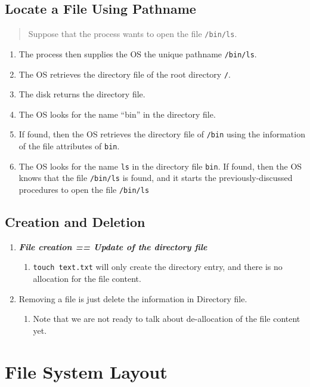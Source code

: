 \documentclass[]{report}
\renewcommand{\emph}[1]{\textbf{\textit{#1}}}
\begin{document}
		\subsection{Locate a File Using Pathname}
		\begin{quote}
			Suppose that the process wants to open the file \verb|/bin/ls|.
		\end{quote}
		\begin{enumerate}
			\item The process then supplies the OS the unique pathname \verb|/bin/ls|.
			\item The OS retrieves the directory file of the root directory \verb|/|.
			\item The disk returns the directory file.
			\item The OS looks for the name “bin” in the directory file.
			\item If found, then the OS retrieves the directory file of \verb|/bin| using the information of the file attributes of \verb|bin|.
			\item The OS looks for the name \verb|ls| in the directory file \verb|bin|. If found, then the OS knows that the file \verb|/bin/ls| is found, and it starts the previously-discussed procedures to open the file \verb|/bin/ls|
		\end{enumerate}

		\subsection{Creation and Deletion}
		\begin{enumerate}
			\item \emph{File creation == Update of the directory file}
			\begin{enumerate}
				\item \verb|touch text.txt| will only create the directory entry, and there is no allocation for the file content.
			\end{enumerate}
			\item Removing a file is just delete the information in Directory file.
			\begin{enumerate}
				\item Note that we are not ready to talk about de-allocation of the file content yet.
			\end{enumerate}
		\end{enumerate}
	\section{File System Layout}
\end{document}
